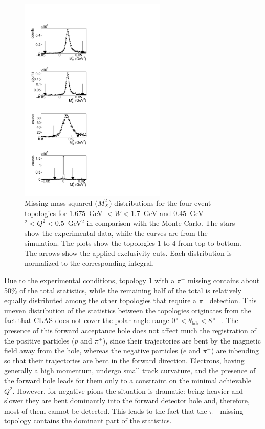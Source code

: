 \documentclass[prc,twocolumn,superscriptaddress,showpacs,amssymb,amsmath,amsfonts,aps,nofootinbib]{revtex4-1}
\begin{document}
\begin{figure}[htp!]
\begin{center}
 \includegraphics[width=7cm,keepaspectratio]{pictures/excl_cut/miss_mass.pdf} 
\vspace{-0.1cm}
\caption{
Missing mass squared ($M_{X}^{2}$) distributions for the four event topologies for $1.675$~GeV $< W < 1.7$~GeV and $0.45$~GeV$^{2} < Q^{2} < 0.5$~GeV$^{2}$ in comparison with the Monte Carlo. The stars show the experimental data, while the curves are from the simulation.
The plots show the topologies 1 to 4 from top to bottom. The arrows show the applied exclusivity cuts. 
Each distribution is normalized to the corresponding integral.}
\label{fig:miss_mass}
\end{center}
\end{figure}

Due to the experimental conditions, topology 1 with a $\pi^{-}$ missing contains about 50\% of the total statistics, while the remaining half of the total is relatively equally distributed among the other topologies that require a $\pi^{-}$ detection. This uneven distribution of the statistics between the topologies originates from the fact that CLAS does not cover the polar angle range $0\,^{\circ}\mathrm{} < \theta_{\text{lab}} < 8\,^{\circ}\mathrm{}$ ~\cite{Me03}. 
The presence of this forward acceptance hole does not affect much the registration of the positive particles ($p$ and $\pi^{+}$), since their trajectories are bent by the magnetic field away from the hole, whereas the negative particles ($e$ and $\pi^{-}$) are inbending so that their trajectories are bent in the forward direction. Electrons, having generally a high momentum, undergo small track curvature, and the presence of the forward hole leads for them only to
a constraint on the minimal achievable $Q^2$. However, for negative pions the situation is dramatic: being heavier and slower they are bent dominantly into the forward detector hole and, therefore, most of them cannot be detected. This leads to the fact that the $\pi^{-}$ missing topology contains the dominant part of the statistics.
\end{document}
